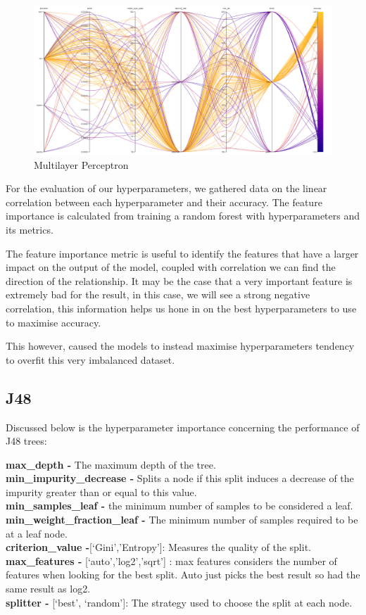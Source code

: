 \documentclass[11pt]{article}
\begin{document}
\begin{figure}[h]
  \caption {Multilayer Perceptron} \label{MLPLineGraph}
  \centering 
  \includegraphics[width = \textwidth, height = 0.3\textheight, keepaspectratio]{Images/MLP ParallelCoordGraph.png}
\end{figure}


For the evaluation of our hyperparameters, we gathered data on the linear correlation between each hyperparameter and their accuracy. The feature importance is calculated from training a random forest with hyperparameters and its metrics. \cite{ParameterImportance}
\par
The feature importance metric is useful to identify the features that have a larger impact on the output of the model, coupled with correlation we can find the direction of the relationship. It may be the case that a very important feature is extremely bad for the result, in this case, we will see a strong negative correlation, this information helps us hone in on the best hyperparameters to use to maximise accuracy.
\par
This however, caused the models to instead maximise hyperparameters tendency to overfit this very imbalanced dataset.
\newpage
\subsection{J48}

Discussed below is the hyperparameter \cite{SklearnTreeDecisionTreeClassifier} importance concerning the performance of J48 trees:

\textbf{max\_depth -} The maximum depth of the tree. \\
\textbf{min\_impurity\_decrease -} Splits a node if this split induces a decrease of the impurity greater than or equal to this value. \\
\textbf{min\_samples\_leaf -} the minimum number of samples to be considered a leaf. \\
\textbf{min\_weight\_fraction\_leaf -} The minimum number of samples required to be at a leaf node. \\
\textbf{criterion\_value -}[‘Gini’,’Entropy’]: Measures the quality of the split.\\
\textbf{max\_features -} [‘auto’,’log2’,’sqrt’] : max features considers the number of features when looking for the best split. Auto just picks the best result so had the same result as log2. \\
\textbf{splitter -} [‘best’, ‘random’]: The strategy used to choose the split at each node. 
\newline
\end{document}
